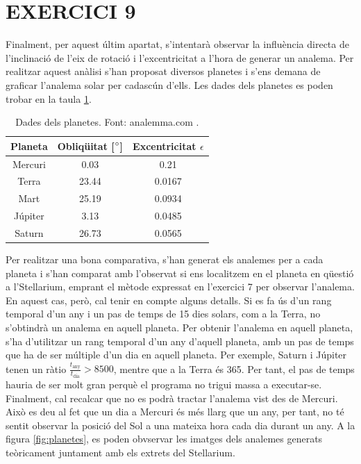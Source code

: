 \documentclass[a4paper, 11pt]{article}
\begin{document}

\section*{EXERCICI 9}

\noindent Finalment, per aquest últim apartat, s'intentarà observar la influència directa de l'inclinació de l'eix de rotació i l'excentricitat a l'hora de generar un analema. Per realitzar aquest anàlisi s'han proposat diversos planetes i s'ens demana de graficar l'analema solar per cadascún d'ells. Les dades dels planetes es poden trobar en la taula \ref{tab:planetes}.

\vspace{2mm}
\begin{table}[h!]
    \centering
    \begin{tabular}{|c|c|c|}
        \hline
        Planeta & Obliqüitat [$\degree$] & Excentricitat $\epsilon$ \\
        \hline
        Mercuri & 0.03 & 0.21 \\
        Terra & 23.44 & 0.0167 \\
        Mart & 25.19 & 0.0934 \\
        Júpiter & 3.13 & 0.0485 \\
        Saturn & 26.73 & 0.0565 \\
        \hline
    \end{tabular}
    \caption{Dades dels planetes. Font: analemma.com \cite{PLANETES}.}
    \label{tab:planetes}
\end{table}
\vspace{2mm}

\noindent Per realitzar una bona comparativa, s'han generat els analemes per a cada planeta i s'han comparat amb l'observat si ens localitzem en el planeta en qüestió a l'Stellarium, emprant el mètode expressat en l'exercici 7 per observar l'analema. En aquest cas, però, cal tenir en compte alguns detalls. Si es fa ús d'un rang temporal d'un any i un pas de temps de 15 dies solars, com a la Terra, no s'obtindrà un analema en aquell planeta. Per obtenir l'analema en aquell planeta, s'ha d'utilitzar un rang temporal d'un any d'aquell planeta, amb un pas de temps que ha de ser múltiple d'un dia en aquell planeta. Per exemple, Saturn i Júpiter tenen un ràtio $\frac{t_{\text{any}}}{t_{\text{dia}}} > 8500$, mentre que a la Terra és 365. Per tant, el pas de temps hauria de ser molt gran perquè el programa no trigui massa a executar-se. Finalment, cal recalcar que no es podrà tractar l'analema vist des de Mercuri. Això es deu al fet que un dia a Mercuri és més llarg que un any, per tant, no té sentit observar la posició del Sol a una mateixa hora cada dia durant un any. A la figura \ref{fig:planetes}, es poden obvservar les imatges dels analemes generats teòricament juntament amb els extrets del Stellarium.
\end{document}

